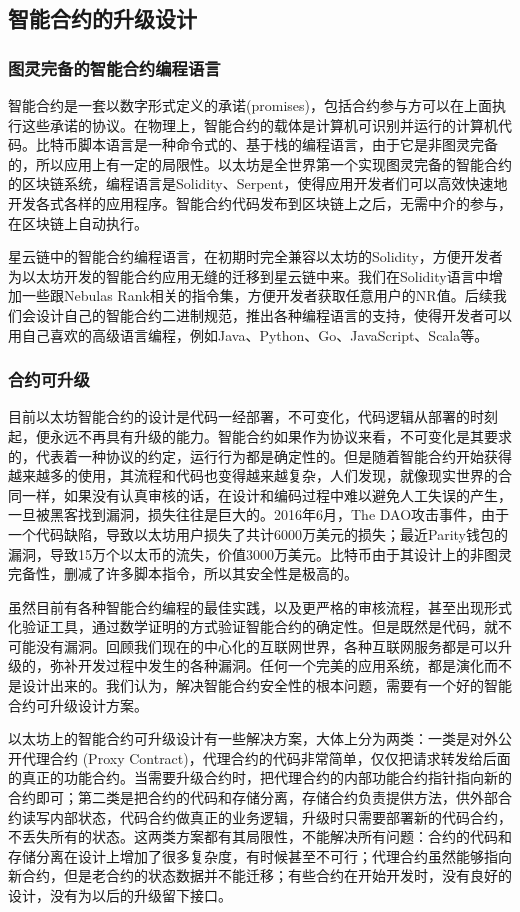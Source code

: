 \subsection{智能合约的升级设计}
\subsubsection{图灵完备的智能合约编程语言}
智能合约是一套以数字形式定义的承诺(promises)，包括合约参与方可以在上面执行这些承诺的协议。在物理上，智能合约的载体是计算机可识别并运行的计算机代码。比特币脚本语言是一种命令式的、基于栈的编程语言，由于它是非图灵完备的，所以应用上有一定的局限性。以太坊是全世界第一个实现图灵完备的智能合约的区块链系统，编程语言是Solidity、Serpent，使得应用开发者们可以高效快速地开发各式各样的应用程序。智能合约代码发布到区块链上之后，无需中介的参与，在区块链上自动执行。

星云链中的智能合约编程语言，在初期时完全兼容以太坊的Solidity，方便开发者为以太坊开发的智能合约应用无缝的迁移到星云链中来。我们在Solidity语言中增加一些跟Nebulas Rank相关的指令集，方便开发者获取任意用户的NR值。后续我们会设计自己的智能合约二进制规范，推出各种编程语言的支持，使得开发者可以用自己喜欢的高级语言编程，例如Java、Python、Go、JavaScript、Scala等。

\subsubsection{合约可升级}
目前以太坊智能合约的设计是代码一经部署，不可变化，代码逻辑从部署的时刻起，便永远不再具有升级的能力。智能合约如果作为协议来看，不可变化是其要求的，代表着一种协议的约定，运行行为都是确定性的。但是随着智能合约开始获得越来越多的使用，其流程和代码也变得越来越复杂，人们发现，就像现实世界的合同一样，如果没有认真审核的话，在设计和编码过程中难以避免人工失误的产生，一旦被黑客找到漏洞，损失往往是巨大的。2016年6月，The DAO攻击事件，由于一个代码缺陷，导致以太坊用户损失了共计6000万美元的损失；最近Parity钱包的漏洞，导致15万个以太币的流失，价值3000万美元。比特币由于其设计上的非图灵完备性，删减了许多脚本指令，所以其安全性是极高的。

虽然目前有各种智能合约编程的最佳实践，以及更严格的审核流程，甚至出现形式化验证工具，通过数学证明的方式验证智能合约的确定性。但是既然是代码，就不可能没有漏洞。回顾我们现在的中心化的互联网世界，各种互联网服务都是可以升级的，弥补开发过程中发生的各种漏洞。任何一个完美的应用系统，都是演化而不是设计出来的。我们认为，解决智能合约安全性的根本问题，需要有一个好的智能合约可升级设计方案。

以太坊上的智能合约可升级设计有一些解决方案，大体上分为两类：一类是对外公开代理合约 (Proxy Contract)，代理合约的代码非常简单，仅仅把请求转发给后面的真正的功能合约。当需要升级合约时，把代理合约的内部功能合约指针指向新的合约即可；第二类是把合约的代码和存储分离，存储合约负责提供方法，供外部合约读写内部状态，代码合约做真正的业务逻辑，升级时只需要部署新的代码合约，不丢失所有的状态。这两类方案都有其局限性，不能解决所有问题：合约的代码和存储分离在设计上增加了很多复杂度，有时候甚至不可行；代理合约虽然能够指向新合约，但是老合约的状态数据并不能迁移；有些合约在开始开发时，没有良好的设计，没有为以后的升级留下接口。


